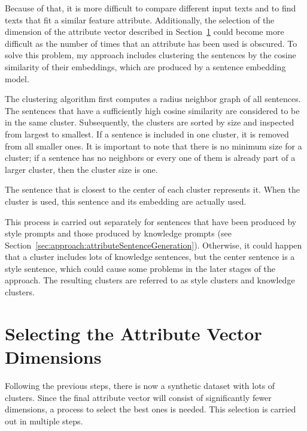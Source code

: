 Because of that, it is more difficult to compare different input texts and to find texts that fit a similar feature attribute. Additionally, the selection of the dimension of the attribute vector described in Section~\ref{sec:approach:selection} could become more difficult as the number of times that an attribute has been used is obscured.
To solve this problem, my approach includes clustering the sentences by the cosine similarity of their embeddings, which are produced by a sentence embedding model.

The clustering algorithm first computes a radius neighbor graph of all sentences. The sentences that have a sufficiently high cosine similarity are considered to be in the same cluster. Subsequently, the clusters are sorted by size and inspected from largest to smallest. If a sentence is included in one cluster, it is removed from all smaller ones. It is important to note that there is no minimum size for a cluster; if a sentence has no neighbors or every one of them is already part of a larger cluster, then the cluster size is one.

The sentence that is closest to the center of each cluster represents it. When the cluster is used, this sentence and its embedding are actually used.

This process is carried out separately for sentences that have been produced by style prompts and those produced by knowledge prompts (see Section~\ref{sec:approach:attributeSentenceGeneration}). Otherwise, it could happen that a cluster includes lots of knowledge sentences, but the center sentence is a style sentence, which could cause some problems in the later stages of the approach. %
The resulting clusters are referred to as style clusters and knowledge clusters.


\section{Selecting the Attribute Vector Dimensions}
\label{sec:approach:selection}

Following the previous steps, there is now a synthetic dataset with lots of clusters. Since the final attribute vector will consist of significantly fewer dimensions, a process to select the best ones is needed. This selection is carried out in multiple steps.


